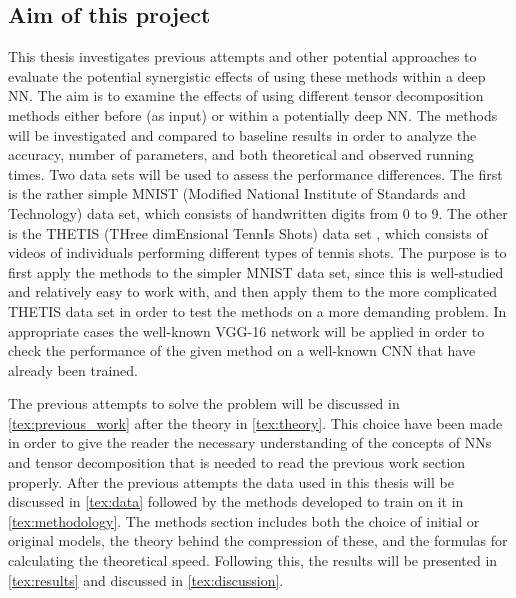 \subsection{Aim of this project}
This thesis investigates previous attempts and other potential approaches to evaluate the potential synergistic effects of using these methods within a deep NN. The aim is to examine the effects of using different tensor decomposition methods either before (as input) or within a potentially deep NN. The methods will be investigated and compared to baseline results in order to analyze the accuracy, number of parameters, and both theoretical and observed running times. Two data sets will be used to assess the performance differences. The first is the rather simple MNIST (Modified National Institute of Standards and Technology) data set\cite{MNIST}, which consists of handwritten digits from 0 to 9. The other is the THETIS (THree dimEnsional TennIs Shots) data set \cite{Gourgari2013}, which consists of videos of individuals performing different types of tennis shots. The purpose is to first apply the methods to the simpler MNIST data set, since this is well-studied and relatively easy to work with, and then apply them to the more complicated THETIS data set in order to test the methods on a more demanding problem. In appropriate cases the well-known VGG-16 network will be applied in order to check the performance of the given method on a well-known CNN that have already been trained.

The previous attempts to solve the problem will be discussed in \autoref{tex:previous_work} after the theory in \autoref{tex:theory}. This choice have been made in order to give the reader the necessary understanding of the concepts of NNs and tensor decomposition that is needed to read the previous work section properly. After the previous attempts the data used in this thesis will be discussed in \autoref{tex:data} followed by the methods developed to train on it in \autoref{tex:methodology}. The methods section includes both the choice of initial or original models, the theory behind the compression of these, and the formulas for calculating the theoretical speed. Following this, the results will be presented in \autoref{tex:results} and discussed in \autoref{tex:discussion}.